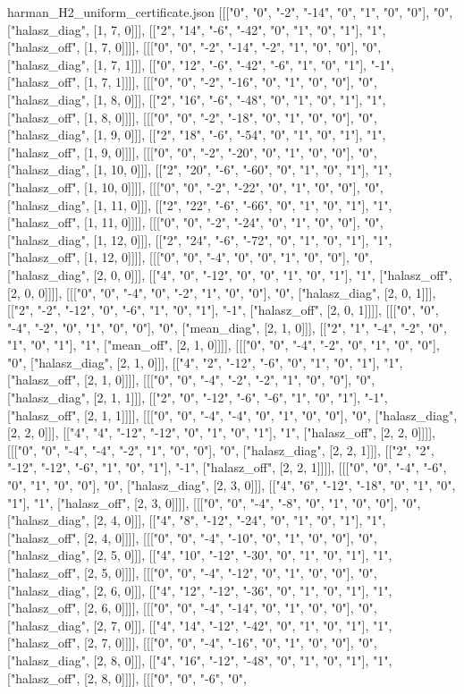 \begin{filecontents*}[overwrite]{harman_H2_uniform_certificate.json}
[[["0", "0", "-2", "-14", "0", "1", "0", "0"], "0", ["halasz_diag", [1, 7, 0]]], [["2", "14", "-6", "-42", "0", "1", "0", "1"], "1", ["halasz_off", [1, 7, 0]]]], [[["0", "0", "-2", "-14", "-2", "1", "0", "0"], "0", ["halasz_diag", [1, 7, 1]]], [["0", "12", "-6", "-42", "-6", "1", "0", "1"], "-1", ["halasz_off", [1, 7, 1]]]], [[["0", "0", "-2", "-16", "0", "1", "0", "0"], "0", ["halasz_diag", [1, 8, 0]]], [["2", "16", "-6", "-48", "0", "1", "0", "1"], "1", ["halasz_off", [1, 8, 0]]]], [[["0", "0", "-2", "-18", "0", "1", "0", "0"], "0", ["halasz_diag", [1, 9, 0]]], [["2", "18", "-6", "-54", "0", "1", "0", "1"], "1", ["halasz_off", [1, 9, 0]]]], [[["0", "0", "-2", "-20", "0", "1", "0", "0"], "0", ["halasz_diag", [1, 10, 0]]], [["2", "20", "-6", "-60", "0", "1", "0", "1"], "1", ["halasz_off", [1, 10, 0]]]], [[["0", "0", "-2", "-22", "0", "1", "0", "0"], "0", ["halasz_diag", [1, 11, 0]]], [["2", "22", "-6", "-66", "0", "1", "0", "1"], "1", ["halasz_off", [1, 11, 0]]]], [[["0", "0", "-2", "-24", "0", "1", "0", "0"], "0", ["halasz_diag", [1, 12, 0]]], [["2", "24", "-6", "-72", "0", "1", "0", "1"], "1", ["halasz_off", [1, 12, 0]]]], [[["0", "0", "-4", "0", "0", "1", "0", "0"], "0", ["halasz_diag", [2, 0, 0]]], [["4", "0", "-12", "0", "0", "1", "0", "1"], "1", ["halasz_off", [2, 0, 0]]]], [[["0", "0", "-4", "0", "-2", "1", "0", "0"], "0", ["halasz_diag", [2, 0, 1]]], [["2", "-2", "-12", "0", "-6", "1", "0", "1"], "-1", ["halasz_off", [2, 0, 1]]]], [[["0", "0", "-4", "-2", "0", "1", "0", "0"], "0", ["mean_diag", [2, 1, 0]]], [["2", "1", "-4", "-2", "0", "1", "0", "1"], "1", ["mean_off", [2, 1, 0]]]], [[["0", "0", "-4", "-2", "0", "1", "0", "0"], "0", ["halasz_diag", [2, 1, 0]]], [["4", "2", "-12", "-6", "0", "1", "0", "1"], "1", ["halasz_off", [2, 1, 0]]]], [[["0", "0", "-4", "-2", "-2", "1", "0", "0"], "0", ["halasz_diag", [2, 1, 1]]], [["2", "0", "-12", "-6", "-6", "1", "0", "1"], "-1", ["halasz_off", [2, 1, 1]]]], [[["0", "0", "-4", "-4", "0", "1", "0", "0"], "0", ["halasz_diag", [2, 2, 0]]], [["4", "4", "-12", "-12", "0", "1", "0", "1"], "1", ["halasz_off", [2, 2, 0]]]], [[["0", "0", "-4", "-4", "-2", "1", "0", "0"], "0", ["halasz_diag", [2, 2, 1]]], [["2", "2", "-12", "-12", "-6", "1", "0", "1"], "-1", ["halasz_off", [2, 2, 1]]]], [[["0", "0", "-4", "-6", "0", "1", "0", "0"], "0", ["halasz_diag", [2, 3, 0]]], [["4", "6", "-12", "-18", "0", "1", "0", "1"], "1", ["halasz_off", [2, 3, 0]]]], [[["0", "0", "-4", "-8", "0", "1", "0", "0"], "0", ["halasz_diag", [2, 4, 0]]], [["4", "8", "-12", "-24", "0", "1", "0", "1"], "1", ["halasz_off", [2, 4, 0]]]], [[["0", "0", "-4", "-10", "0", "1", "0", "0"], "0", ["halasz_diag", [2, 5, 0]]], [["4", "10", "-12", "-30", "0", "1", "0", "1"], "1", ["halasz_off", [2, 5, 0]]]], [[["0", "0", "-4", "-12", "0", "1", "0", "0"], "0", ["halasz_diag", [2, 6, 0]]], [["4", "12", "-12", "-36", "0", "1", "0", "1"], "1", ["halasz_off", [2, 6, 0]]]], [[["0", "0", "-4", "-14", "0", "1", "0", "0"], "0", ["halasz_diag", [2, 7, 0]]], [["4", "14", "-12", "-42", "0", "1", "0", "1"], "1", ["halasz_off", [2, 7, 0]]]], [[["0", "0", "-4", "-16", "0", "1", "0", "0"], "0", ["halasz_diag", [2, 8, 0]]], [["4", "16", "-12", "-48", "0", "1", "0", "1"], "1", ["halasz_off", [2, 8, 0]]]], [[["0", "0", "-6", "0", 
\end{filecontents*}

